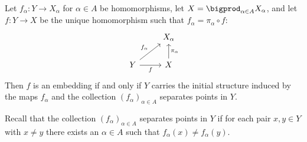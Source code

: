 \documentclass[article, a4paper, 11pt, oneside]{memoir}
\numberwithin{equation}{chapter}
\begin{document}
\begin{proposition}
    Let $f_\alpha \colon Y \to X_\alpha$ for $\alpha \in A$ be homomorphisms, let $X = \bigprod_{\alpha \in A} X_\alpha$, and let $f \colon Y \to X$ be the unique homomorphism such that $f_\alpha = \pi_\alpha \circ f$:
    \begin{equation*}
        \begin{tikzcd}
            & X_\alpha \\
            Y
                \ar[r, "f", swap]
                \ar[ru, "f_\alpha"]
            & X
                \ar[u, "\pi_\alpha", swap]
        \end{tikzcd}
    \end{equation*}
    Then $f$ is an embedding if and only if $Y$ carries the initial structure induced by the maps $f_\alpha$ and the collection $(f_\alpha)_{\alpha \in A}$ separates points in $Y$.
\end{proposition}
%
Recall that the collection $(f_\alpha)_{\alpha \in A}$ separates points in $Y$ if for each pair $x,y \in Y$ with $x \neq y$ there exists an $\alpha \in A$ such that $f_\alpha(x) \neq f_\alpha(y)$.
\end{document}
